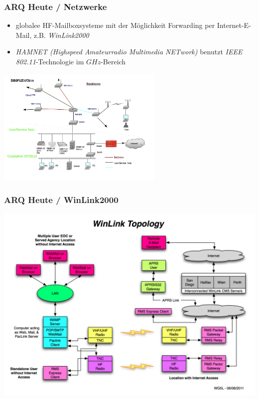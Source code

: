 \begin{frame}
    \frametitle{ARQ Heute / Netzwerke}

    \begin{itemize}
        \item globalee HF-Mailboxsysteme mit der Möglichkeit Forwarding per
              Internet-E-Mail, z.B. \emph{WinLink2000}
        \item \emph{HAMNET (Highspeed Amateurradio Multimedia NETwork)} benutzt
              \emph{IEEE 802.11}-Technologie im $GHz$-Bereich
    \end{itemize}

    \begin{center}
        \includegraphics[width=0.6\textwidth]{e16/db0fuz.png}
        \tiny \hyperlink{refs}{\cite{db0fuz}}
    \end{center}

\end{frame}

\begin{frame}
    \frametitle{ARQ Heute / WinLink2000}

    \begin{center}
        \includegraphics[width=1\textwidth]{e16/WinLink_Topology.jpg}
        \tiny \hyperlink{refs}{\cite{wl2k}}
    \end{center}

\end{frame}


